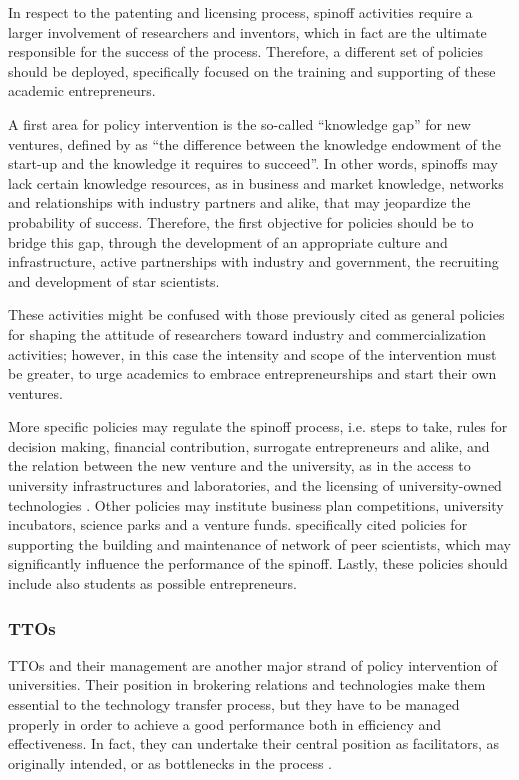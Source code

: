 In respect to the patenting and licensing process, spinoff activities require a larger involvement of researchers and inventors, which in fact are the ultimate responsible for the success of the process. Therefore, a different set of policies should be deployed, specifically focused on the training and supporting of these academic entrepreneurs.

A first area for policy intervention is the so-called \enquote{knowledge gap} for new ventures, defined by \citet{Lockett2005a} as \enquote{the difference between the knowledge endowment of the start-up and the knowledge it requires to succeed}. In other words, spinoffs may lack certain knowledge resources, as in business and market knowledge, networks and relationships with industry partners and alike, that may jeopardize the probability of success. Therefore, the first objective for policies should be to bridge this gap, through the development of an appropriate culture and infrastructure, active partnerships with industry and government, the recruiting and development of star scientists. 

These activities might be confused with those previously cited as general policies for shaping the attitude of researchers toward industry and commercialization activities; however, in this case the intensity and scope of the intervention must be greater, to urge academics to embrace entrepreneurships and start their own ventures.

More specific policies may regulate the spinoff process, i.e. steps to take, rules for decision making, financial contribution, surrogate entrepreneurs \citet{Franklin2001} and alike, and the relation between the new venture and the university, as in the access to university infrastructures and laboratories, and the licensing of university-owned technologies \citep{Fini2009}. Other policies may institute business plan competitions, university incubators, science parks and a venture funds. \citet{Siegel2007} specifically cited policies for supporting the building and maintenance of network of peer scientists, which may significantly influence the performance of the spinoff. Lastly, these policies should include also students as possible entrepreneurs. 

\subsubsection{TTOs}

TTOs and their management are another major strand of policy intervention of universities. Their position in brokering relations and technologies make them essential to the technology transfer process, but they have to be managed properly in order to achieve a good performance both in efficiency and effectiveness. In fact, they can undertake their central position as facilitators, as originally intended, or as bottlenecks in the process \citep{Siegel2003a, Geuna2009}. 

